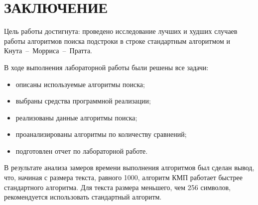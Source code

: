 \section*{ЗАКЛЮЧЕНИЕ}

Цель работы достигнута: проведено исследование лучших и худших случаев работы алгоритмов поиска подстроки в строке стандартным алгоритмом и Кнута~--~Морриса~--~Пратта.

В ходе выполнения лабораторной работы были решены все задачи:
\begin{itemize}
	\item описаны используемые алгоритмы поиска;
	\item выбраны средства программной реализации;
	\item реализованы данные алгоритмы поиска;
	\item проанализированы алгоритмы по количеству сравнений;
	\item подготовлен отчет по лабораторной работе.
\end{itemize}

В результате анализа замеров времени выполнения алгоритмов был сделан вывод, что, начиная с размера текста, равного 1000, алгоритм КМП работает быстрее стандартного алгоритма.
Для текста размера меньшего, чем 256 символов, рекомендуется использовать стандартный алгоритм.